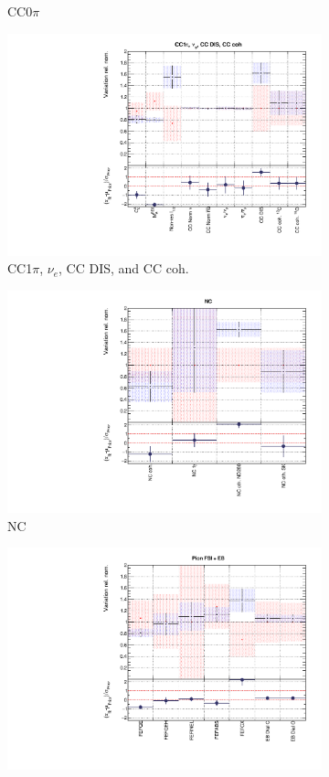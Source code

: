 \begin{figure}[t]
\begin{subfigure}{0.49\textwidth}
  \caption{CC0$\pi$}
\end{subfigure}
\begin{subfigure}{0.49\textwidth}
  \centering
  \includegraphics[width=0.95\linewidth]{figs/rhcmpdatxsec248_2}
  \caption{CC1$\pi$, $\nu_e$, CC DIS, and CC coh.}
\end{subfigure}
\begin{subfigure}{0.49\textwidth}
  \centering
  \includegraphics[width=0.95\linewidth]{figs/rhcmpdatxsec248_3}
  \caption{NC}
\end{subfigure}
\begin{subfigure}{0.49\textwidth}
  \centering
  \includegraphics[width=0.95\linewidth]{figs/rhcmpdatxsec248_4}

\end{subfigure}
\end{figure}

